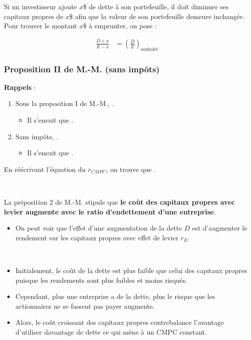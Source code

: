\documentclass[10pt, french]{article}
\begin{document}
\begin{multicols*}{2}
Si un investisseur ajoute $x\$$ de dette à son portefeuille, il doit diminuer ses capitaux propres de $x\$$ afin que la valeur de son portefeuille demeure inchangée. Pour trouver le montant $x\$$ à emprunter, on pose : 

\begin{align*}
	\frac{D + x}{E - x}
	&=	\left(\frac{D}{E}\right)_{\text{souhaité}}
\end{align*}


\columnbreak
\subsubsection{Proposition II de M.-M. (sans impôts)}
\textbf{Rappels} : 
\begin{enumerate}
	\item	Sous la proposition I de M.-M., .
		\begin{itemize}
		\item	Il s'ensuit que .
		\end{itemize}
	\item	Sans impôts, .
		\begin{itemize}
		\item	Il s'ensuit que .
		\end{itemize}
\end{enumerate}

En réécrivant l'équation du $r_{CMPC}$, on trouve que .

\

La préposition 2 de M.-M. stipule que \textbf{le coût des capitaux propres avec levier augmente avec le ratio d'endettement d'une entreprise}.

\begin{itemize}
	\item	On peut voir que l'effet d'une augmentation de la dette $D$ est d'augmenter le rendement sur les capitaux propres avec effet de levier $r_{E}$.
\end{itemize}

\

\begin{itemize}
	\item	Initialement, le coût de la dette est plus faible que celui des capitaux propres puisque les rendements sont plus faibles et moins risqués. 
	\item	Cependant, plus une entreprise a de la dette, plus le risque que les actionnaires ne se fassent pas payer augmente. 
	\item	Alors, le coût croissant des capitaux propres contrebalance l'avantage d'utiliser davantage de dette ce qui mène à un CMPC constant.
\end{itemize}


\end{multicols*}
\end{document}
